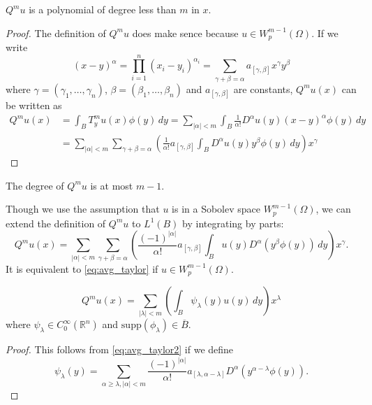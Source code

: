\documentclass{article}
\begin{document}
\begin{proposition}
    $Q^m u$ is a polynomial of degree less than $m$ in $x$.
\end{proposition}
\begin{proof}
    The definition of $Q^m u$ does make sence because $u \in W_p^{m-1}(\Omega)$.
    If we write
    \[
        (x-y)^\alpha = \prod_{i=1}^n (x_i-y_i)^{\alpha_i} = \sum_{\gamma+\beta = \alpha} a_{[\gamma,\beta]} x^{\gamma} y^{\beta}
    \]
    where $\gamma = (\gamma_1,\dots,\gamma_n)$, $\beta = (\beta_1,\dots,\beta_n)$ and $a_{[\gamma,\beta]}$ are constants,
    $Q^m u(x)$ can be written as
    \begin{align*}
        Q^m u(x) & = \int_B T_y^m u(x) \phi(y)\,dy = \sum_{|\alpha|<m} \int_B \frac{1}{\alpha !} D^\alpha u(y) (x-y)^\alpha \phi(y)\,dy
        \\
                 & = \sum_{|\alpha|<m}  \sum_{\gamma+\beta = \alpha}
        \left(\frac{1}{\alpha !} a_{[\gamma,\beta]}  \int_B D^\alpha u(y) y^{\beta} \phi(y)\,dy \right) x^{\gamma}
    \end{align*}
\end{proof}

\begin{note}
    The degree of $Q^m u$ is at most $m-1$.
\end{note}


Though we use the assumption that $u$ is in a Sobolev space $W_p^{m-1}(\Omega)$,
we can extend the definition of $Q^m u$ to $L^1(B)$ by integrating by parts:
\begin{equation}\label{eq:avg_taylor2}
    Q^m u(x) = \sum_{|\alpha|<m}  \sum_{\gamma+\beta = \alpha}
    \left(\frac{(-1)^{|\alpha|}}{\alpha !} a_{[\gamma,\beta]}  \int_B u(y) D^\alpha(y^{\beta} \phi(y))\,dy \right) x^{\gamma}.
\end{equation}
It is equivalent to \eqref{eq:avg_taylor} if $u \in W_p^{m-1}(\Omega)$.

\begin{proposition}
    \begin{equation} \label{eq:avg_taylor3}
        Q^m u(x) = \sum_{|\lambda| < m} \left( \int_B \psi_\lambda(y) u(y)\,dy \right) x^\lambda
    \end{equation}
    where $\psi_\lambda \in C_0^\infty(\mathbb{R}^n)$ and $\mathrm{supp}(\phi_\lambda) \in \overline{B}$.
\end{proposition}

\begin{proof}
    This follows from \eqref{eq:avg_taylor2} if we define
    \begin{equation}
        \psi_\lambda(y) = \sum_{\alpha \ge \lambda,|\alpha|<m}
        \frac{(-1)^{|\alpha|}}{\alpha !} a_{[\lambda,\alpha-\lambda]} D^\alpha(y^{\alpha-\lambda} \phi(y)).
    \end{equation}
\end{proof}
\end{document}
